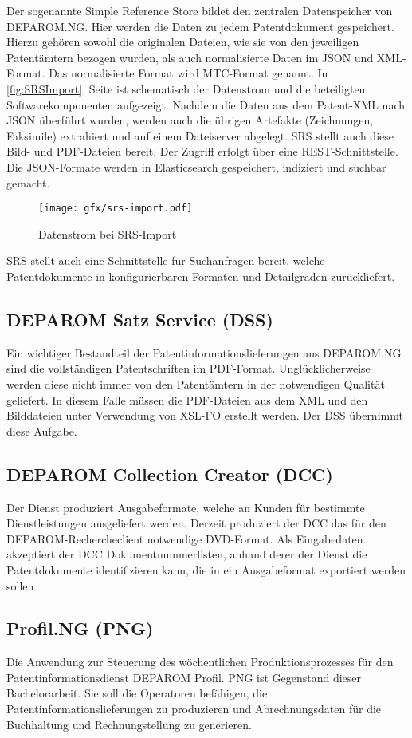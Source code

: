 Der sogenannte Simple Reference Store bildet den zentralen Datenspeicher von
DEPAROM.NG. Hier werden die Daten zu jedem Patentdokument gespeichert. Hierzu
gehören sowohl die originalen Dateien, wie sie von den jeweiligen Patentämtern
bezogen wurden, als auch normalisierte Daten im JSON und XML-Format. Das
normalisierte Format wird MTC-Format genannt. In \autoref{fig:SRSImport}, Seite
\pageref{fig:SRSImport} ist schematisch  der Datenstrom und die beteiligten
Softwarekomponenten aufgezeigt. Nachdem die Daten aus dem Patent-XML nach JSON
überführt wurden, werden auch die übrigen Artefakte (Zeichnungen, Faksimile)
extrahiert und auf einem Dateiserver abgelegt. SRS stellt auch diese Bild- und
PDF-Dateien bereit. Der Zugriff erfolgt über eine REST-Schnittstelle. Die
JSON-Formate werden in Elasticsearch gespeichert, indiziert und suchbar gemacht.

\begin{figure}[h]
  \texttt{[image: gfx/srs-import.pdf]}
  \caption{Datenstrom bei SRS-Import}
  \label{fig:SRSImport}
\end{figure}

SRS stellt auch eine Schnittstelle für Suchanfragen bereit, welche
Patentdokumente in konfigurierbaren Formaten und Detailgraden zurückliefert.

\subsection{DEPAROM Satz Service (DSS)}
\label{ch:fachlichesUmfeld:Teilsysteme:DSS}

Ein wichtiger Bestandteil der Patentinformationslieferungen aus DEPAROM.NG sind
die vollständigen Patentschriften im PDF-Format. Unglücklicherweise werden diese
nicht immer von den Patentämtern in der notwendigen Qualität geliefert. In
diesem Falle müssen die PDF-Dateien aus dem XML und den Bilddateien unter
Verwendung von XSL-FO erstellt werden. Der DSS übernimmt diese Aufgabe.

\subsection{DEPAROM Collection Creator (DCC)}
\label{ch:fachlichesUmfeld:Teilsysteme:DCC}

Der Dienst produziert Ausgabeformate, welche an Kunden für bestimmte
Dienstleistungen ausgeliefert werden. Derzeit produziert der DCC das für den
DEPAROM-Rechercheclient notwendige DVD-Format. Als Eingabedaten akzeptiert der
DCC Dokumentnummerlisten, anhand derer der Dienst die Patentdokumente
identifizieren kann, die in ein Ausgabeformat exportiert werden sollen.

\subsection{Profil.NG (PNG)}
\label{ch:fachlichesUmfeld:Teilsysteme:PNG}

Die Anwendung zur Steuerung des wöchentlichen Produktionsprozesses für den
Patentinformationsdienst DEPAROM Profil. PNG ist Gegenstand dieser
Bachelorarbeit. Sie soll die Operatoren befähigen, die
Patentinformationslieferungen zu produzieren und Abrechnungsdaten für die
Buchhaltung und Rechnungstellung zu generieren.
